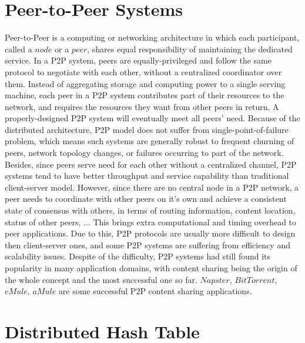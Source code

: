 \section{Peer-to-Peer Systems}
\label{s:peertopeersystems}

Peer-to-Peer is a computing or networking architecture in which each participant, called a $node$ or a $peer$, shares equal responsibility of maintaining the dedicated service. In a P2P system, peers are equally-privileged and follow the same protocol to negotiate with each other, without a centralized coordinator over them. Instead of aggregating storage and computing power to a single serving machine, each peer in a P2P system contributes part of their resources to the network, and requires the resources they want from other peers in return. A properly-designed P2P system will eventually meet all peers' need. Because of the distributed architecture, P2P model does not suffer from single-point-of-failure problem, which means such systems are generally robust to frequent churning of peers, network topology changes, or failures occurring to part of the network. Besides, since peers serve need for each other without a centralized channel, P2P systems tend to have better throughput and service capability than traditional client-server model. However, since there are no central node in a P2P network, a peer needs to coordinate with other peers on it's own and achieve a consistent state of consensus with others, in terms of routing information, content location, status of other peers, ... This brings extra computational and timing overhead to peer applications. Due to this, P2P protocols are usually more difficult to design then client-server ones, and some P2P systems are suffering from efficiency and scalability issues. Despite of the difficulty, P2P systems had still found its popularity in many application domains, with content sharing being the origin of the whole concept and the most successful one so far. $Napster$\cite{napster}, $BitTorrent$\cite{bittorrent}, $eMule$\cite{emule}, $aMule$\cite{amule} are some successful P2P content sharing applications.

\newpage

\section{Distributed Hash Table}
\label{s:distributedhashtable}

